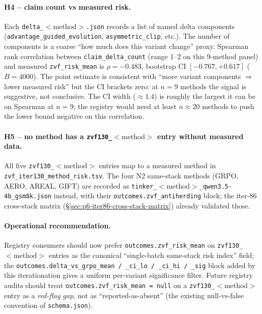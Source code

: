\documentclass{article}
\begin{document}
\paragraph{H4 -- claim count vs measured risk.}
Each \texttt{delta\_$<\mathrm{method}>$.json} records a list of named
delta components (\texttt{advantage\_guided\_evolution},
\texttt{asymmetric\_clip}, etc.). The number of components is a coarse
``how much does this variant change'' proxy. Spearman rank correlation
between \texttt{claim\_delta\_count} (range 1--2 on this 9-method panel)
and measured \texttt{zvf\_risk\_mean} is $\rho{=}{-}0.483$, bootstrap CI
$[-0.767, +0.617]$ ($B{=}4000$). The point estimate is consistent with
``more variant components $\Rightarrow$ lower measured risk'' but the CI
brackets zero: at $n{=}9$ methods the signal is suggestive, not
conclusive. The CI width ($\approx 1.4$) is roughly the largest it can be
on Spearman at $n{=}9$; the registry would need at least $n{\approx}20$
methods to push the lower bound negative on this correlation.

\paragraph{H5 -- no method has a \texttt{zvf130\_$<\mathrm{method}>$} entry without measured data.}
All five \texttt{zvf130\_$<\mathrm{method}>$} entries map to a measured
method in \texttt{zvf\_iter130\_method\_risk.tsv}. The four N2 same-stack
methods (GRPO, AERO, AREAL, GIFT) are recorded as
\texttt{tinker\_$<\mathrm{method}>$\_qwen3.5-4b\_gsm8k.json} instead, with
their \texttt{outcomes.zvf\_antiherding} block; the iter-86 cross-stack
matrix (\S\ref{sec:p6-iter86-cross-stack-matrix}) already validated those.

\paragraph{Operational recommendation.}
Registry consumers should now prefer \texttt{outcomes.zvf\_risk\_mean}
on \texttt{zvf130\_$<\mathrm{method}>$} entries as the canonical
``single-batch same-stack risk index'' field; the
\texttt{outcomes.delta\_vs\_grpo\_mean / \_ci\_lo / \_ci\_hi / \_sig} block
added by this iterationation gives a uniform per-variant significance filter.
Future registry audits should treat
\texttt{outcomes.zvf\_risk\_mean = null} on a \texttt{zvf130\_$<\mathrm{method}>$}
entry as a \emph{red-flag gap}, not as ``reported-as-absent'' (the existing
null-vs-false convention of \texttt{schema.json}).
\end{document}
